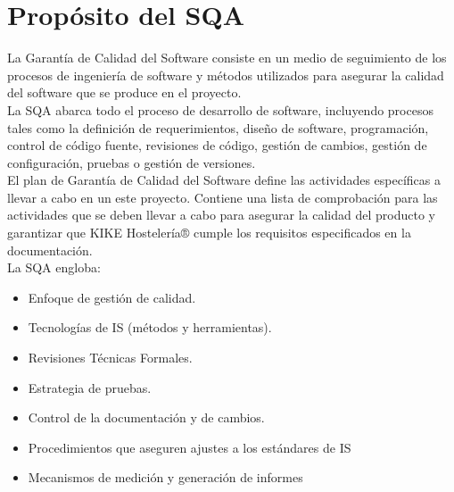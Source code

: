 \documentclass[spanish,a4paper,11pt, twoside]{report}	%
\begin{document}
\newpage
\mbox{}
\thispagestyle{empty}						%
\newpage


\tableofcontents 							%

\newpage
\mbox{}
\thispagestyle{empty}						%
\newpage



\chapter{ Propósito del SQA}

	
	 La Garantía de Calidad del Software consiste en un medio de seguimiento de los procesos de ingeniería de software y métodos utilizados para asegurar la calidad del software que se produce en el proyecto.\\
	
	La SQA abarca todo el proceso de desarrollo de software, incluyendo procesos tales como la definición de requerimientos, diseño de software, programación, control de código fuente, revisiones de código, gestión de cambios, gestión de configuración, pruebas o gestión de versiones.\\
	
	El plan de Garantía de Calidad del Software define las actividades específicas a llevar a cabo en un este proyecto. Contiene una lista de comprobación para las actividades que se deben llevar a cabo para asegurar la calidad del producto y garantizar que KIKE Hostelería® cumple los requisitos especificados en la documentación.\\
	La SQA engloba:

\begin{itemize}
	\item Enfoque de gestión de calidad.
	\item Tecnologías de IS (métodos y herramientas).
	\item Revisiones Técnicas Formales.
	\item Estrategia de pruebas.
	\item Control de la documentación y de cambios.
	\item Procedimientos que aseguren ajustes a los estándares de IS
	\item Mecanismos de medición y generación de informes
\end{itemize}	
\end{document}
